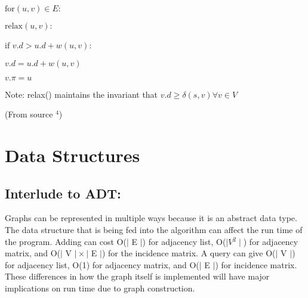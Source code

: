 \documentclass{article}
\begin{document}
\hspace{5 pt}\hspace{5 pt}\hspace{5 pt}$\text{for} (u,v) \in E:$
 
\hspace{5 pt}\hspace{5 pt}\hspace{5 pt}\hspace{5 pt}$\text{relax}(u,v):$
  
\hspace{5 pt}\hspace{5 pt}\hspace{5 pt}\hspace{5 pt}\hspace{5 pt}$\text{if}$ \hspace{1 pt} $v.d > u.d + w(u,v):$
   
\hspace{5 pt}\hspace{5 pt}\hspace{5 pt}\hspace{5 pt}\hspace{5 pt}\hspace{5 pt}$v.d = u.d + w(u,v)$
	
\hspace{5 pt}\hspace{5 pt}\hspace{5 pt}\hspace{5 pt}\hspace{5 pt}\hspace{5 pt}$v.\pi = u$

Note: relax() maintains the invariant that $v.d \geq \delta(s,v) \forall v \in V$

(From source $^4$)

\section{Data Structures}

\subsection{Interlude to ADT:}

Graphs can be represented in multiple ways because it is an abstract data type.  The data structure that is being fed into the algorithm can affect the run time of the program.  Adding can cost O($\mid$ E $\mid$) for adjacency list, O($\mid V{^2} \mid$) for adjacency matrix, and O($\mid$ V $\mid \times \mid$ E $\mid$) for the incidence matrix.  A query can give O($\mid$ V $\mid$) for adjacency list, O(1) for adjacency matrix, and O($\mid$ E $\mid$) for incidence matrix. These differences in how the graph itself is implemented will have major implications on run time due to graph construction.
\end{document}
